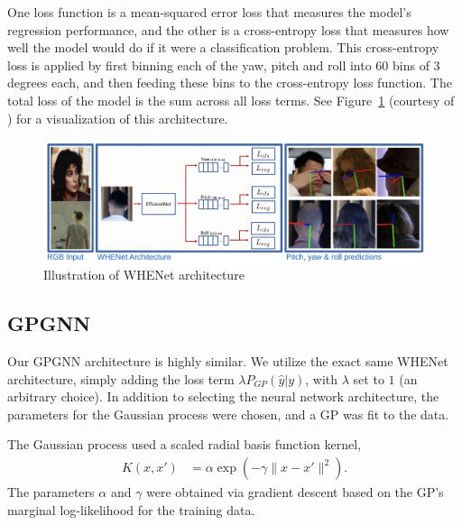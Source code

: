 \documentclass[11pt,letterpaper]{article}
\begin{document}
    One loss function is a mean-squared error loss that measures the model's regression performance, and the other is a cross-entropy loss that measures how well the model would do if it were a classification problem. This cross-entropy loss is applied by first binning each of the yaw, pitch and roll into $60$ bins of $3$ degrees each, and then feeding these bins to the cross-entropy loss function. The total loss of the model is the sum across all loss terms. See Figure~\ref{fig:whenet_architecture} (courtesy of \cite{whenet}) for a visualization of this architecture.
    \begin{figure}[!htb]
    \centering
       \includegraphics[width=0.65\linewidth]{./pics/whenet.png}
       \caption{Illustration of WHENet architecture}
       \label{fig:whenet_architecture}
    \end{figure}

  \subsection{GPGNN}
    Our GPGNN architecture is highly similar.
    We utilize the exact same WHENet architecture, simply adding the loss term $ \lambda P_{GP}(\hat{y}|y) $, with $ \lambda $ set to $ 1 $ (an arbitrary choice).
    In addition to selecting the neural network architecture, the parameters for the Gaussian process were chosen, and a GP was fit to the data.

    The Gaussian process used a scaled radial basis function kernel, \begin{align*}
        K(x,x') &= \alpha \exp( -\gamma \lVert x - x' \rVert^2 ).
    \end{align*}
    The parameters $ \alpha $ and $ \gamma $ were obtained via gradient descent based on the GP's marginal log-likelihood for the training data.
\end{document}
